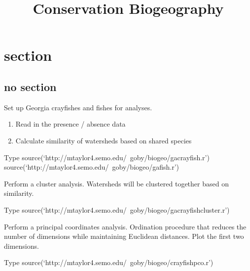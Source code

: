 \documentclass[xcolor=svgnames]{beamer}
\title{Conservation Biogeography}
\begin{document}
\section{section}
\subsection{no section}

\begin{frame}[plain]{Set up Georgia crayfishes and fishes for analyses.}
\begin{enumerate}
	\item Read in the presence / absence data
	\item Calculate similarity of watersheds based on shared species
\end{enumerate}
\pause

\begin{block}{Type}
	source(`http://mtaylor4.semo.edu/~goby/biogeo/gacrayfish.r') \pause
	source(`http://mtaylor4.semo.edu/~goby/biogeo/gafish.r')
\end{block}
\end{frame}


\begin{frame}[plain]{Perform a cluster analysis.}
Watersheds will be clustered together based on similarity. 
\pause

\begin{block}{Type}
	source(`http://mtaylor4.semo.edu/~goby/biogeo/gacrayfishcluster.r')
\end{block}


\end{frame}

{
\begin{frame}[plain]
\end{frame}
}

\begin{frame}[plain]{Perform a principal coordinates analysis.}
Ordination procedure that reduces the number of dimensions while maintaining Euclidean distances. Plot the first two dimensions.
\pause

\begin{block}{Type}
	source(`http://mtaylor4.semo.edu/~goby/biogeo/crayfishpco.r')
\end{block}


\end{frame}

{
\begin{frame}[plain]
\end{frame}
}
\end{document}
